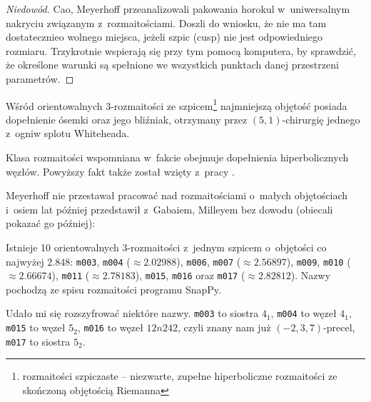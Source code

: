 \begin{proof}[Niedowód]
%
%
    Cao, Meyerhoff \cite{cao01} przeanalizowali pakowania horokul w~uniwersalnym nakryciu związanym z~rozmaitościami.
    Doszli do wniosku, że nie ma tam dostatecznieo wolnego miejsca, jeżeli szpic (cusp) nie jest odpowiedniego rozmiaru.
    Trzykrotnie wspierają się przy tym pomocą komputera, by sprawdzić, że określone warunki są spełnione we wszystkich punktach danej przestrzeni parametrów.
\end{proof}

\begin{proposition}
%
    Wśród orientowalnych 3-rozmaitości ze szpicem\footnote{rozmaitości szpiczaste -- niezwarte, zupełne hiperboliczne rozmaitości ze skończoną objętością Riemanna} najmniejszą objętość posiada dopełnienie ósemki oraz jego bliźniak, otrzymany przez $(5, 1)$-chirurgię jednego z~ogniw splotu Whiteheada.
\end{proposition}

Klasa rozmaitości wspomniana w~fakcie obejmuje dopełnienia hiperbolicznych węzłów.
Powyższy fakt także został wzięty z~pracy \cite{cao01}.

Meyerhoff nie przestawał pracować nad rozmaitościami o~małych objętościach i~osiem lat później przedstawił z~Gabaiem, Milleyem \cite{meyerhoff09} bez dowodu (obiecali pokazać go później):
%
%

\begin{proposition}
%
    Istnieje 10 orientowalnych 3-rozmaitości z~jednym szpicem o~objętości co najwyżej $2.848$: \texttt{m003}, \texttt{m004} ($\approx 2.02988$), \texttt{m006}, \texttt{m007} ($\approx 2.56897$), \texttt{m009}, \texttt{m010} ($\approx 2.66674$), \texttt{m011} ($\approx 2.78183$), \texttt{m015}, \texttt{m016} oraz \texttt{m017} ($\approx 2.82812$).
    Nazwy pochodzą ze spisu rozmaitości programu SnapPy.
\end{proposition}

Udało mi się rozszyfrować niektóre nazwy.
\texttt{m003} to siostra $4_1$, %
\texttt{m004} to węzeł $4_1$, %
\texttt{m015} to węzeł $5_2$,
\texttt{m016} to węzeł $12n242$, czyli znany nam już $(-2, 3, 7)$-precel,
%
\texttt{m017} to siostra $5_2$. %

